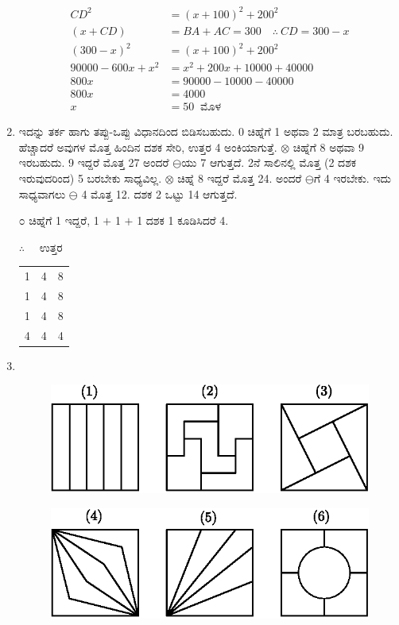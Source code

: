 \begin{enumerate}
\begin{align*}
CD^{2} & = (x + 100)^{2} + 200^{2}\\
(x+CD) & = BA + AC = 300 \quad\therefore~ CD = 300 - x\\
(300 - x)^{2} & = (x + 100)^{2} + 200^{2}\\
90000 - 600x + x^{2} & = x^{2} + 200x + 10000 + 40000\\
800x & = 90000 - 10000 - 40000\\
800x & = 4000\\
x & = 50 ~\text{ ಮೊಳ}
\end{align*}

\item ಇದನ್ನು ತರ್ಕ ಹಾಗು ತಪ್ಪು-ಒಪ್ಪು ವಿಧಾನದಿಂದ ಬಿಡಿಸಬಹುದು. 0 ಚಿಹ್ನೆಗೆ 1 ಅಥವಾ 2 ಮಾತ್ರ ಬರಬಹುದು. ಹೆಚ್ಚಾದರೆ ಅವುಗಳ ಮೊತ್ತ ಹಿಂದಿನ ದಶಕ ಸೇರಿ, ಉತ್ತರ 4 ಅಂಕಿಯಾಗುತ್ತೆ. $\otimes$ ಚಿಹ್ನೆಗೆ 8 ಅಥವಾ 9 ಇರಬಹುದು. 9 ಇದ್ದರೆ ಮೊತ್ತ 27 ಅಂದರೆ $\ominus$ಯು 7 ಆಗುತ್ತದೆ. 2ನೆ ಸಾಲಿನಲ್ಲಿ ಮೊತ್ತ (2 ದಶಕ ಇರುವುದರಿಂದ) 5 ಬರಬೇಕು ಸಾಧ್ಯವಿಲ್ಲ. $\otimes$ ಚಿಹ್ನೆ 8 ಇದ್ದರೆ ಮೊತ್ತ 24. ಅಂದರೆ $\ominus$ಗೆ 4 ಇರಬೇಕು. ಇದು ಸಾಧ್ಯವಾಗಲು $\ominus$ 4 ಮೊತ್ತ 12. ದಶಕ 2 ಒಟ್ಟು 14 ಆಗುತ್ತದೆ. 

೦ ಚಿಹ್ನೆಗೆ 1 ಇದ್ದರೆ, 1 $+$ 1 $+$ 1 ದಶಕ 1 ಕೂಡಿಸಿದರೆ 4. 

\smallskip

$\therefore\quad$ ಉತ್ತರ
\begin{tabular}[t]{lll}
1 & 4 & 8\\
1 & 4 & 8\\
1 & 4 & 8\\
\hline
4 & 4 & 4\\
\end{tabular}

\item
~
\vskip -0.3cm

\begin{figure}[H]
\centering
\includegraphics{images/chap12/ans25a.eps}
\end{figure} 

\begin{figure}[H]
\centering
\includegraphics{images/chap12/ans25b.eps}
\end{figure} 



\end{enumerate}
